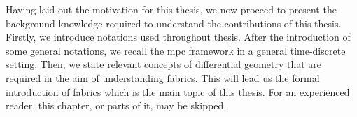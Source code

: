 Having laid out the motivation for this thesis, we now proceed to present the
background knowledge required to understand the contributions of this thesis.
Firstly, we introduce notations used throughout thesis. After the introduction
of some general notations, we recall the \ac{mpc} framework in a general
time-discrete setting.
Then, we state relevant concepts of differential geometry that are
required in the aim of understanding \ac{fabrics}. This will lead us the formal
introduction of \ac{fabrics} which is the main topic of this thesis.
For an experienced reader, this chapter, or parts of it, may be skipped.
